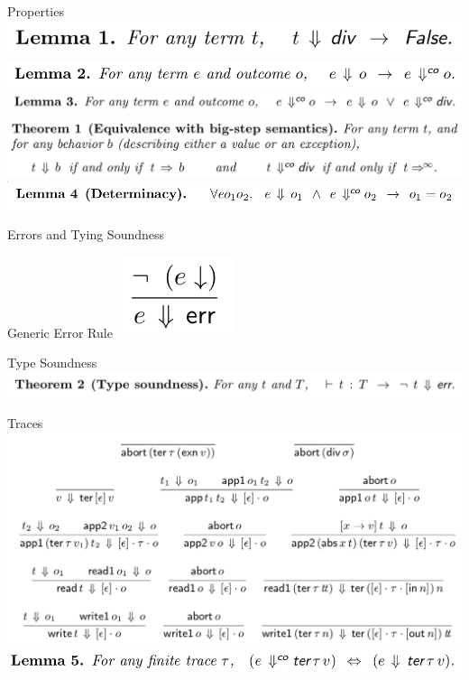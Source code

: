 \documentclass[page number,dvipsnames]{beamer}
\begin{document}
\begin{frame}{Properties}
  \center
  \includegraphics[scale=0.3]{lemma1.png}
  \vfill
  \includegraphics[scale=0.3]{lemma2.png}
  \vfill
  \includegraphics[scale=0.3]{lemma3.png}
  \vfill
  \includegraphics[scale=0.3]{thm1.png}
  \vfill
  \includegraphics[scale=0.3]{lemma4.png}
\end{frame}

\begin{frame}{Errors and Tying Soundness}
  \begin{block}{Generic Error Rule}
    \center
    \includegraphics[scale=0.3]{error.png}
  \end{block}
  \vfill
  \begin{exampleblock}{Type Soundness}
    \center
    \includegraphics[scale=0.3]{thm2.png}
  \end{exampleblock}
\end{frame}

\begin{frame}{Traces}
  \center
  \includegraphics[scale=0.25]{traces.png}
  \vfill
  \includegraphics[scale=0.3]{lemma5.png}
\end{frame}
\end{document}
